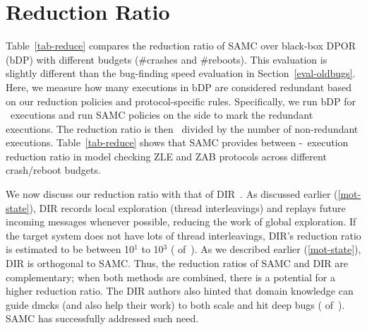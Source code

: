 

\section{Reduction Ratio}
\label{eval-reduce}


Table~\ref{tab-reduce} compares the reduction ratio of SAMC over
black-box DPOR (bDP) with different budgets (\#crashes and \#reboots).
This evaluation is slightly different than the bug-finding speed evaluation
in Section~\ref{eval-oldbugs}.  Here, we measure how many executions in bDP
are considered redundant based on our reduction policies and
protocol-specific rules.  Specifically, we run bDP for
\numRedRatioExecs\ executions and run SAMC policies on the side to mark the
redundant executions.  The reduction ratio is then
\numRedRatioExecs\ divided by the number of non-redundant executions.
Table~\ref{tab-reduce} shows that SAMC provides between
\numMinRedRatio-\numMaxRedRatio\ execution reduction ratio in model
checking ZLE and ZAB protocols across different crash/reboot budgets.


We now discuss our reduction ratio with that of DIR~\cite{Guo+11-Demeter}.
As discussed earlier (\sec\ref{mot-state}), DIR records local exploration
(thread interleavings) and replays future incoming messages whenever
possible, reducing the work of global exploration.  If the target system
does not have lots of thread interleavings, DIR's reduction ratio is
estimated to be between 10$^{1}$ to 10$^{3}$ (
of~\cite{Guo+11-Demeter}).  As we described earlier (\sec\ref{mot-state}),
DIR is orthogonal to SAMC.  Thus, the reduction ratios of SAMC and DIR are
complementary; when both methods are combined, there is a potential for a
higher reduction ratio.  The DIR authors also hinted that domain knowledge
can guide dmcks (and also help their work) to both scale and hit deep bugs
( of~\cite{Guo+11-Demeter}).  SAMC has successfully addressed such
need.




